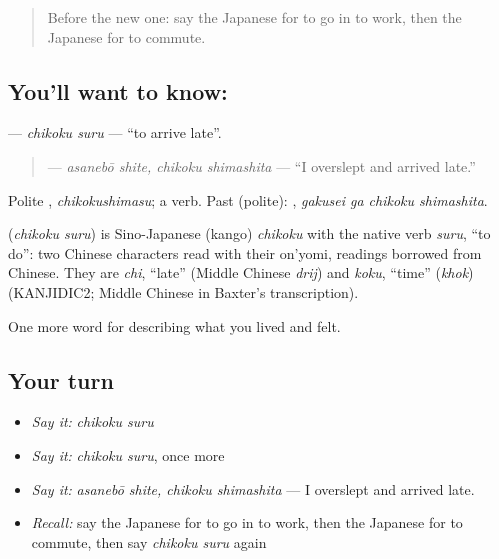\begin{quote}
Before the new one: say the Japanese for to go in to work, then the Japanese for to commute.
\end{quote}

\subsection*{You'll want to know: }
\textbf{} — \emph{chikoku suru} — \textquotedblleft{}to arrive late\textquotedblright{}.

\begin{quote}
\textbf{} — \emph{asanebō shite, chikoku shimashita} — \textquotedblleft{}I overslept and arrived late.\textquotedblright{}
\end{quote}

Polite \textbf{}, \emph{chikokushimasu}; a  verb. Past (polite): \textbf{ }, \emph{gakusei ga chikoku shimashita}.

\begin{cousinweb}
\textbf{} (\emph{chikoku suru}) is Sino-Japanese (kango) \emph{chikoku} with the native verb \emph{suru}, \textquotedblleft{}to do\textquotedblright{}: two Chinese characters read with their on'yomi, readings borrowed from Chinese. They are \emph{chi}, \textquotedblleft{}late\textquotedblright{} (Middle Chinese \emph{drij}) and \emph{koku}, \textquotedblleft{}time\textquotedblright{} (\emph{khok}) (KANJIDIC2; Middle Chinese in Baxter's transcription).
\end{cousinweb}

\begin{grammarlens}[title={What you've built}]
One more word for describing what you lived and felt.
\end{grammarlens}

\subsection*{Your turn}
\begin{itemize}
\raggedright
  \item \emph{Say it:} \emph{chikoku suru}
  \item \emph{Say it:} \emph{chikoku suru}, once more
  \item \emph{Say it:} \emph{asanebō shite, chikoku shimashita} — I overslept and arrived late.
  \item \emph{Recall:} say the Japanese for to go in to work, then the Japanese for to commute, then say \emph{chikoku suru} again
\end{itemize}

